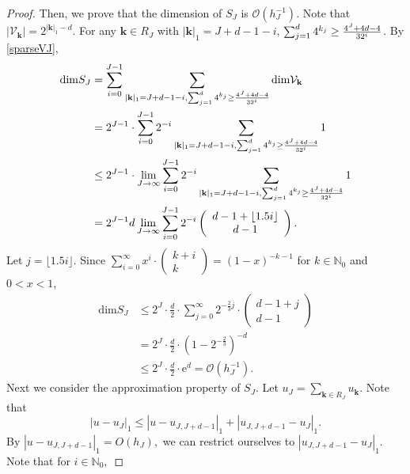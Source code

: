 \begin{proof}
Then, we prove that  the dimension of $S_J$ is $\mathcal{O}(h_J^{-1})$. 
Note that $\left|\mathcal V_{\mathbf{k}}\right| = 2^{|\mathbf{k}|_{1}-d}$. For any $\mathbf{k}\in R_J$ with $|\mathbf{k}|_{1}=J+d-1-i$, $ \sum_{j=1}^d 4^{k_j}\ge {4^J+4d-4\over 32^i}$. By \eqref{sparseVJ},
\begin{equation}
\begin{split}
\mbox{dim}S_J&=\sum_{i=0}^{J-1}  \sum_{|\mathbf{k}|_{1}=J+d-1-i, \sum_{j=1}^d 4^{k_j}\ge {4^J+4d-4\over 32^i}} \mbox{dim}\mathcal V_{\mathbf{k}}
\\
&=2^{J-1} \cdot \sum_{i=0}^{J-1} 2^{-i}  \sum_{|\mathbf{k}|_{1}=J+d-1-i, \sum_{j=1}^d 4^{k_j}\ge {4^J+4d-4\over 32^i}}1
\\
& \leq 2^{J-1} \cdot \lim _{J \rightarrow \infty} \sum_{i=0}^{J-1} 2^{-i} \sum_{|\mathbf{k}|_{1}=J+d-1-i, \sum_{j=1}^d 4^{k_j}\ge {4^J+4d-4\over 32^i}}1
\\
&=2^{J-1} d \lim _{J \rightarrow \infty} \sum_{i=0}^{J-1} 2^{-i}  \left(\begin{array}{c}
d-1+\lfloor 1.5 i\rfloor \\
d-1
\end{array}\right).
\end{split}
\end{equation} 
Let $j=\lfloor 1.5 i\rfloor $. Since $\displaystyle\sum_{i=0}^{\infty} x^{i} \cdot\left(\begin{array}{c}k+i \\ k\end{array}\right)=(1-x)^{-k-1}$ for $k \in \mathbb{N}_{0}$ and $0<x<1$,
\begin{equation}
\begin{split}
\mbox{dim}S_J
& \leq 2^{J} \cdot \frac{d}{2} \cdot \sum_{j=0}^{\infty} 2^{-\frac{2}{3} j} \cdot\left(\begin{array}{c}
d-1+j \\
d-1
\end{array}\right) 
\\
&=2^{J} \cdot \frac{d}{2} \cdot\left(1-2^{-\frac{2}{3}}\right)^{-d}
\\
& \leq 2^{J} \cdot \frac{d}{2} \cdot \mathrm{e}^{d}=\mathcal{O}(h_J^{-1}).
\end{split}
\end{equation} 
Next we consider the approximation property of $S_J$. Let $\displaystyle u_J=\sum_{\mathbf{k}\in R_J}u_{\mathbf{k}}$. Note that 
$$
\left|u-u_J\right|_1 \leq\left|u-u_{J,J+d-1}\right|_1+\left|u_{J,J+d-1}-u_J\right|_1.
$$
By $\left|u-u_{J,J+d-1}\right|_1=O\left(h_{J}\right),$ we can restrict ourselves to $\left|u_{J,J+d-1}-u_J\right|_1.$ Note that  for $i \in \mathbb{N}_{0},$ 

\end{proof}
